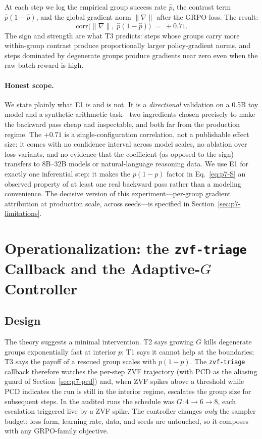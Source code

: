 \documentclass{article}
\begin{document}
At each step we log the empirical group success rate $\hat p$, the contrast
term $\hat p(1-\hat p)$, and the global gradient norm $\|\nabla\|$ after the
GRPO loss. The result:
\begin{equation}
  \mathrm{corr}\bigl(\|\nabla\|,\; \hat p(1-\hat p)\bigr) \;=\; +0.71 .
  \label{eq:p7-e1}
\end{equation}
The sign and strength are what T3 predicts: steps whose groups carry more
within-group contrast produce proportionally larger policy-gradient norms,
and steps dominated by degenerate groups produce gradients near zero even
when the raw batch reward is high.

\paragraph{Honest scope.} We state plainly what E1 is and is not. It is a
\emph{directional} validation on a 0.5B toy model and a synthetic arithmetic
task---two ingredients chosen precisely to make the backward pass cheap and
inspectable, and both far from the production regime. The $+0.71$ is a
single-configuration correlation, not a publishable effect size: it comes
with no confidence interval across model scales, no ablation over loss
variants, and no evidence that the coefficient (as opposed to the sign)
transfers to 8B--32B models or natural-language reasoning data. We use E1
for exactly one inferential step: it makes the $p(1-p)$ factor in
Eq.~\eqref{eq:p7-S} an observed property of at least one real backward pass
rather than a modeling convenience. The decisive version of this
experiment---per-group gradient attribution at production scale, across
seeds---is specified in Section~\ref{sec:p7-limitations}.
 \section{Operationalization: the \texttt{zvf-triage} Callback and the
Adaptive-$G$ Controller}
\label{sec:p7-controller}
\label{sec:p7-controller-family}

\subsection{Design}
\label{sec:p7-controller-design}
The theory suggests a minimal intervention. T2 says growing $G$ kills
degenerate groups exponentially fast at interior $p$; T1 says it cannot help
at the boundaries; T3 says the payoff of a rescued group scales with
$p(1-p)$. The \texttt{zvf-triage} callback therefore watches the per-step
ZVF trajectory (with PCD as the aliasing guard of
Section~\ref{sec:p7-pcd}) and, when ZVF spikes above a threshold while PCD
indicates the run is still in the interior regime, escalates the group size
for subsequent steps. In the audited runs the schedule was $G: 4 \to 6 \to
8$, each escalation triggered live by a ZVF spike. The controller changes
\emph{only} the sampler budget; loss form, learning rate, data, and seeds
are untouched, so it composes with any GRPO-family objective.
\end{document}
